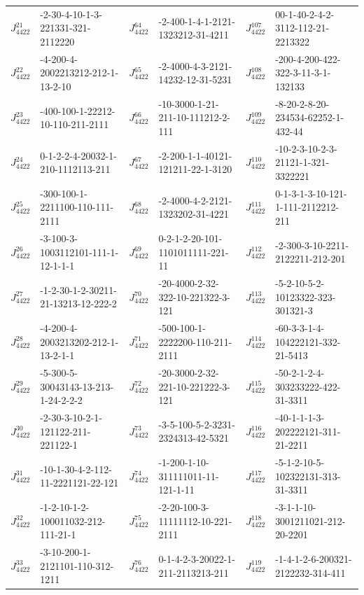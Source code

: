 \begin{table}[t]
\begin{tabular}{l l l l l l}
 $J^{21}_{4422}$&-2-30-4-10-1-3-221331-321-2112220&\hphantom{}$J^{64}_{4422}$&-2-400-1-4-1-2121-1323212-31-4211&\hphantom{}$J^{107}_{4422}$&00-1-40-2-4-2-3112-112-21-2213322\\
 $J^{22}_{4422}$&-4-200-4-2002213212-212-1-13-2-10&\hphantom{}$J^{65}_{4422}$&-2-4000-4-3-2121-14232-12-31-5231&\hphantom{}$J^{108}_{4422}$&-200-4-200-422-322-3-11-3-1-132133\\
 $J^{23}_{4422}$&-400-100-1-22212-10-110-211-2111&\hphantom{}$J^{66}_{4422}$&-10-3000-1-21-211-10-111212-2-111&\hphantom{}$J^{109}_{4422}$&-8-20-2-8-20-234534-62252-1-432-44\\
 $J^{24}_{4422}$&0-1-2-2-4-20032-1-210-1112113-211&\hphantom{}$J^{67}_{4422}$&-2-200-1-1-40121-121211-22-1-3120&\hphantom{}$J^{110}_{4422}$&-10-2-3-10-2-3-21121-1-321-3322221\\
 $J^{25}_{4422}$&-300-100-1-2211100-110-111-2111&\hphantom{}$J^{68}_{4422}$&-2-4000-4-2-2121-1323202-31-4221&\hphantom{}$J^{111}_{4422}$&0-1-3-1-3-10-121-1-111-2112212-211\\
 $J^{26}_{4422}$&-3-100-3-1003112101-111-1-12-1-1-1&\hphantom{}$J^{69}_{4422}$&0-2-1-2-20-101-1101011111-221-11&\hphantom{}$J^{112}_{4422}$&-2-300-3-10-2211-2122211-212-201\\
 $J^{27}_{4422}$&-1-2-30-1-2-30211-21-13213-12-222-2&\hphantom{}$J^{70}_{4422}$&-20-4000-2-32-322-10-221322-3-121&\hphantom{}$J^{113}_{4422}$&-5-2-10-5-2-10123322-323-301321-3\\
 $J^{28}_{4422}$&-4-200-4-2003213202-212-1-13-2-1-1&\hphantom{}$J^{71}_{4422}$&-500-100-1-2222200-110-211-2111&\hphantom{}$J^{114}_{4422}$&-60-3-3-1-4-104222121-332-21-5413\\
 $J^{29}_{4422}$&-5-300-5-30043143-13-213-1-24-2-2-2&\hphantom{}$J^{72}_{4422}$&-20-3000-2-32-221-10-221222-3-121&\hphantom{}$J^{115}_{4422}$&-50-2-1-2-4-303233222-422-31-3311\\
 $J^{30}_{4422}$&-2-30-3-10-2-1-121122-211-221122-1&\hphantom{}$J^{73}_{4422}$&-3-5-100-5-2-3231-2324313-42-5321&\hphantom{}$J^{116}_{4422}$&-40-1-1-1-3-202222121-311-21-2211\\
 $J^{31}_{4422}$&-10-1-30-4-2-112-11-2221121-22-121&\hphantom{}$J^{74}_{4422}$&-1-200-1-10-311111011-11-121-1-11&\hphantom{}$J^{117}_{4422}$&-5-1-2-10-5-102322131-313-31-3311\\
 $J^{32}_{4422}$&-1-2-10-1-2-100011032-212-111-21-1&\hphantom{}$J^{75}_{4422}$&-2-20-100-3-11111112-10-221-2111&\hphantom{}$J^{118}_{4422}$&-3-1-1-10-3001211021-212-20-2201\\
 $J^{33}_{4422}$&-3-10-200-1-2121101-110-312-1211&\hphantom{}$J^{76}_{4422}$&0-1-4-2-3-20022-1-211-2113213-211&\hphantom{}$J^{119}_{4422}$&-1-4-1-2-6-200321-2122232-314-411\\

\end{tabular}
\end{table}
